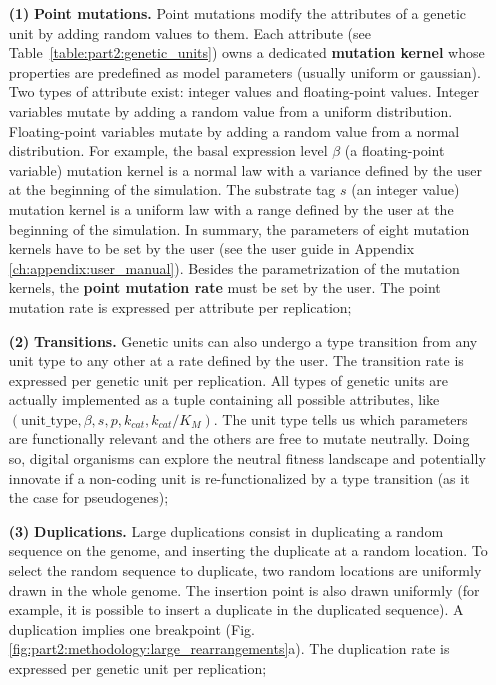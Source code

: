 \begin{enumerate}
\item[\textbf{(1)}] \textbf{Point mutations.} Point mutations modify the attributes of a genetic unit by adding random values to them. Each attribute (see Table~\ref{table:part2:genetic_units}) owns a dedicated \textbf{mutation kernel} whose properties are predefined as model parameters (usually uniform or gaussian). Two types of attribute exist: integer values and floating-point values. Integer variables mutate by adding a random value from a uniform distribution. Floating-point variables mutate by adding a random value from a normal distribution. For example, the basal expression level $\beta$ (a floating-point variable) mutation kernel is a normal law with a variance defined by the user at the beginning of the simulation. The substrate tag $s$ (an integer value) mutation kernel is a uniform law with a range defined by the user at the beginning of the simulation. In summary, the parameters of eight mutation kernels have to be set by the user (see the {\EvoEvoSim} user guide in Appendix \ref{ch:appendix:user_manual}). Besides the parametrization of the mutation kernels, the \textbf{point mutation rate} must be set by the user. The point mutation rate is expressed per attribute per replication;
\item[\textbf{(2)}] \textbf{Transitions.} Genetic units can also undergo a type transition from any unit type to any other at a rate defined by the user. The transition rate is expressed per genetic unit per replication. All types of genetic units are actually implemented as a tuple containing all possible attributes, like $(\text{unit\_type}, \beta, s, p, k_{cat}, k_{cat}/K_M)$. The unit type tells us which parameters are functionally relevant and the others are free to mutate neutrally. Doing so, digital organisms can explore the neutral fitness landscape and potentially innovate if a non-coding unit is re-functionalized by a type transition (as it the case for pseudogenes);
\item[\textbf{(3)}] \textbf{Duplications.} Large duplications consist in duplicating a random sequence on the genome, and inserting the duplicate at a random location. To select the random sequence to duplicate, two random locations are uniformly drawn in the whole genome. The insertion point is also drawn uniformly (for example, it is possible to insert a duplicate in the duplicated sequence). A duplication implies one breakpoint (Fig. \ref{fig:part2:methodology:large_rearrangements}a). The duplication rate is expressed per genetic unit per replication;

\end{enumerate}
